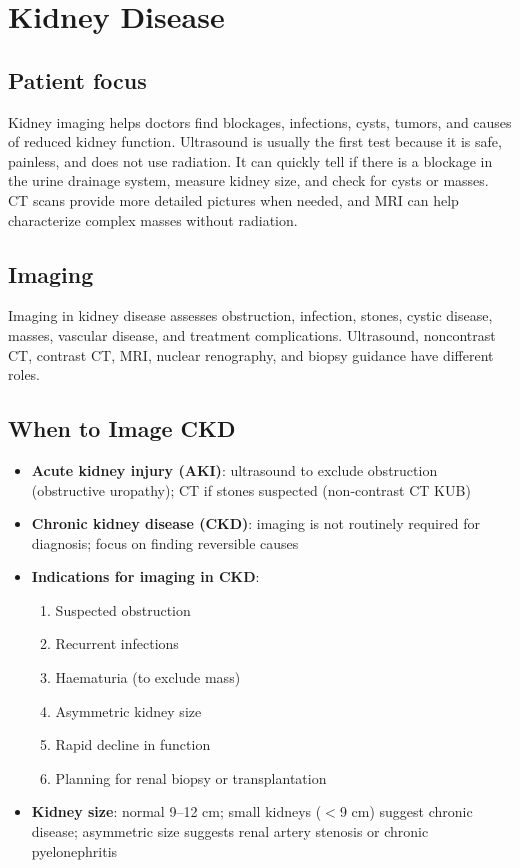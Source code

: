 \chapter{Kidney Disease}

\section*{Patient focus}
Kidney imaging helps doctors find blockages, infections, cysts, tumors, and causes of reduced kidney function. Ultrasound is usually the first test because it is safe, painless, and does not use radiation. It can quickly tell if there is a blockage in the urine drainage system, measure kidney size, and check for cysts or masses. CT scans provide more detailed pictures when needed, and MRI can help characterize complex masses without radiation.


\label{ch:ch65_kidney_disease}

\section{Imaging}
Imaging in kidney disease assesses obstruction, infection, stones, cystic disease, masses, vascular disease, and treatment complications. Ultrasound, noncontrast CT, contrast CT, MRI, nuclear renography, and biopsy guidance have different roles.

\section{When to Image CKD}
\begin{itemize}
  \item \textbf{Acute kidney injury (AKI)}: ultrasound to exclude obstruction (obstructive uropathy); CT if stones suspected (non-contrast CT KUB)
  \item \textbf{Chronic kidney disease (CKD)}: imaging is not routinely required for diagnosis; focus on finding reversible causes
  \item \textbf{Indications for imaging in CKD}:
    \begin{enumerate}
      \item Suspected obstruction
      \item Recurrent infections
      \item Haematuria (to exclude mass)
      \item Asymmetric kidney size
      \item Rapid decline in function
      \item Planning for renal biopsy or transplantation
    \end{enumerate}
  \item \textbf{Kidney size}: normal 9--12 cm; small kidneys ($<$9 cm) suggest chronic disease; asymmetric size suggests renal artery stenosis or chronic pyelonephritis
\end{itemize}

